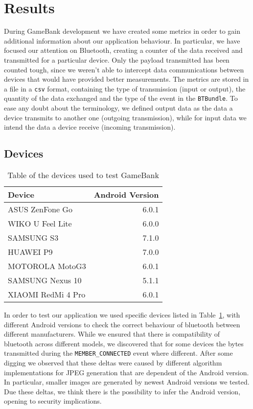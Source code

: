 \section{Results}

During GameBank development we have created some metrics in order to gain 
additional information about our application behaviour. In particular, we 
have focused our attention on Bluetooth, creating a counter of the data 
received and transmitted for a particular device. Only the payload transmitted 
has been counted tough, since we weren't able to intercept data communications 
between devices that would have provided better measurements. The metrics are 
stored in a file in a \texttt{csv} format, containing the type of transmission 
(input or output), the quantity of the data exchanged and the type of the 
event in the \texttt{BTBundle}. To ease any doubt about the terminology, we 
defined output data as the data a device transmits to another one (outgoing 
transmission), while for input data we intend the data a device receive 
(incoming transmission).

\subsection{Devices}

\begin{table}[t]
 \centering
 \caption{Table of the devices used to test GameBank}
 \label{tab:res:lod}
 \begin{tabular}{l r}
  \textbf{Device} & \textbf{Android Version} \\ \toprule
  ASUS ZenFone Go & 6.0.1 \\
  WIKO U Feel Lite & 6.0.0 \\
  SAMSUNG S3 & 7.1.0 \\
  HUAWEI P9 & 7.0.0 \\
  MOTOROLA MotoG3 & 6.0.1 \\
  SAMSUNG Nexus 10 & 5.1.1 \\
  XIAOMI RedMi 4 Pro & 6.0.1
 \end{tabular}
\end{table}

In order to test our application we used specific devices listed in 
Table~\ref{tab:res:lod}, with different Android versions to check the correct 
behaviour of bluetooth between different manufacturers. While we ensured that 
there is compatibility of bluetooth across different models, we discovered that 
for some devices the bytes transmitted during the \texttt{MEMBER\_CONNECTED} 
event where different. After some digging we observed that these deltas were 
caused by different algorithm implementations for JPEG generation that are 
dependent of the Android version. In particular, smaller images are generated 
by newest Android versions we tested. Due these deltas, we think there is the 
possibility to infer the Android version, opening to security implications.

